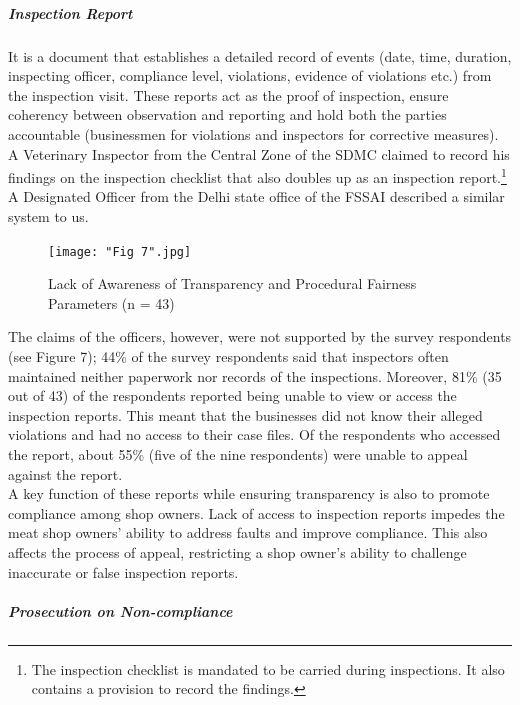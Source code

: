 \documentclass[a4paper, 12pt]{article}
\begin{document}
\subparagraph{Inspection Report}

It is a document that establishes a detailed record of events (date, time, duration, inspecting officer, compliance level, violations, evidence of violations etc.) from the inspection visit. These reports act as the proof of inspection, ensure coherency between observation and reporting and hold both the parties accountable (businessmen for violations and inspectors for corrective measures). \\

A Veterinary Inspector from the Central Zone of the SDMC claimed to record his findings on the inspection checklist that also doubles up as an inspection report.\footnote{The inspection checklist is mandated to be carried during inspections. It also contains a provision to record the findings.} A Designated Officer from the Delhi state office of the FSSAI described a similar system to us.

\begin{figure}[H]
\centering
\texttt{[image: "Fig 7".jpg]}
\caption[Optional Caption]{Lack of Awareness of Transparency and Procedural Fairness Parameters \newline (n = 43)  \footnotemark}
\end{figure} 

The claims of the officers, however, were not supported by the survey respondents (see Figure 7); 44\% of the survey respondents said that inspectors often maintained neither paperwork nor records of the inspections. Moreover, 81\% (35 out of 43) of the respondents reported being unable to view or access the inspection reports. This meant that the businesses did not know their alleged violations and had no access to their case files. Of the respondents who accessed the report, about 55\% (five of the nine respondents) were unable to appeal against the report. \\

A key function of these reports while ensuring transparency is also to promote compliance among shop owners. Lack of access to inspection reports impedes the meat shop owners’ ability to address faults and improve compliance. This also affects the process of appeal, restricting a shop owner’s ability to challenge inaccurate or false inspection reports.\\

\subparagraph{Prosecution on Non-compliance}
\end{document}

